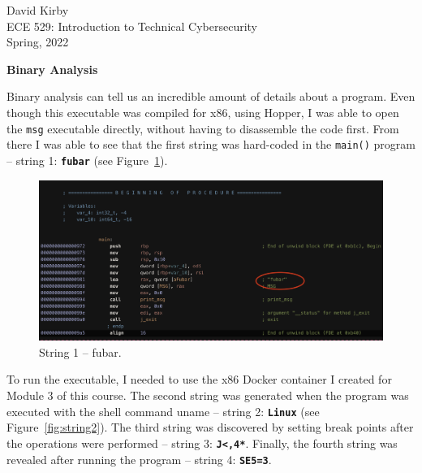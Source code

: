 \documentclass[12pt]{article}
\begin{document}
\setmainfont{SF Pro Text}
\setsansfont{SF Pro Text}
\setmonofont{SF Mono}
\renewcommand{\familydefault}{\sfdefault}

\hypersetup{
    linkcolor=CrispBlue,
    urlcolor=CrispBlue,
    breaklinks=true
}

\noindent David Kirby\\
ECE 529: Introduction to Technical Cybersecurity\\
Spring, 2022
\begin{center}
    \large\bfseries Binary Analysis
\end{center}

Binary analysis can tell us an incredible amount of details about a program. Even though this executable was compiled for x86, using Hopper, I was able to open the \texttt{msg} executable directly, without having to disassemble the code first. From there I was able to see that the first string was hard-coded in the \texttt{main()} program -- string 1: \textbf{\texttt{fubar}} (see Figure~\ref{fig:string1}).
\begin{figure}[!ht]
    \centering
    \includegraphics[width=\textwidth]{figure01.png}%
    \caption{String 1 -- fubar.}
    \label{fig:string1}
\end{figure}

To run the executable, I needed to use the x86 Docker container I created for Module 3 of this course. The second string was generated when the program was executed with the shell command uname -- string 2: \textbf{\texttt{Linux}} (see Figure~\ref{fig:string2}). The third string was discovered by setting break points after the operations were performed -- string 3: \textbf{\texttt{J<,4*}}. Finally, the fourth string was revealed after running the program -- string 4: \textbf{\texttt{SE5=3}}.
\end{document}
